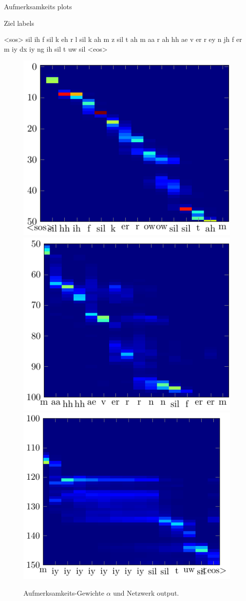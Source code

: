 \documentclass[10pt]{beamer}
\begin{document}
\begin{frame}{Aufmerksamkeits plots}
	\begin{block}{Ziel labels}
		\begin{semiverbatim}
		<sos>  sil  ih  f  sil  k  eh  r  l  sil  k  ah  m  z
		       sil  t  ah  m  aa  r  ah  hh  ae  v  er  r  ey
		       n  jh  f  er  m  iy  dx  iy  ng  ih
		       sil  t  uw  sil
		<eos>
		\end{semiverbatim}
	\end{block}

	\begin{figure}
	\centering
	\includegraphics[height=0.26\linewidth]{../tikz/alphaZoom}
	\includegraphics[height=0.26\linewidth]{../tikz/alphaZoom2}
	\includegraphics[height=0.26\linewidth]{../tikz/alphaZoom3}
	\caption{Aufmerksamkeits-Gewichte $\alpha$ und Netzwerk output.}
	\label{fig:attention3}
	\end{figure}
\end{frame}
\end{document}

